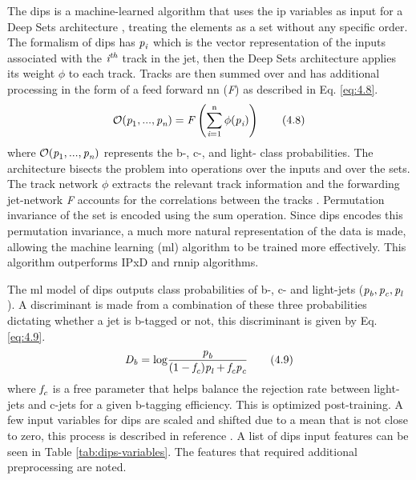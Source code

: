 The \gls{dips} is a machine-learned algorithm that uses the \gls{ip} variables as input for a Deep Sets architecture \cite{Deep_sets}, treating the elements as a set without any specific order. 
The formalism of \gls{dips} has $\textit{\textrm{p}}_{\textit{\textrm{i}}}$ which is the vector representation of the inputs associated with the $\textit{\textrm{i}}^{\textit{\textrm{th}}}$ 
track in the jet, then the Deep Sets architecture applies its weight $\phi$ to each track. Tracks are then summed over and has additional processing in the form of a feed forward 
\gls{nn} (\textit{F}) as described in Eq. \ref{eq:4.8}.
%
\begin{equation}\label{eq:4.8}
    \mathcal{O}({\textit{\textrm{p}}_{\textrm{1}},...,\textit{\textrm{p}}_{\textit{\textrm{n}}}}) = \textrm{\textit{F}}\left(\sum^{\textrm{n}}_{\textit{\textrm{i}}=\textrm{1}}\phi (\textrm{\textit{p}}_{\textit{\textrm{i}}})\right)
\tag{4.8}
\end{equation}
%
where $\mathcal{O}({\textit{\textrm{p}}_{\textrm{1}},...,\textit{\textrm{p}}_{\textit{\textrm{n}}}})$ represents the b-, c-, and light- class probabilities. The architecture 
bisects the problem into operations over the inputs and over the sets. The track network $\phi$ extracts the relevant track information and the forwarding jet-network \textit{F} 
accounts for the correlations between the tracks \cite{DIPS}. Permutation invariance of the set is encoded using the sum operation. Since \gls{dips} encodes this permutation 
invariance, a much more natural representation of the data is made, allowing the machine learning (\gls{ml}) algorithm to be trained more effectively. This algorithm outperforms 
IPxD and \gls{rnnip} algorithms. 
\par
The \gls{ml} model of \gls{dips} outputs class probabilities of b-, c- and light-jets ($\textit{\textrm{p}}_{\textit{\textrm{b}}}, \textit{\textrm{p}}_{\textit{\textrm{c}}}, \textit{\textrm{p}}_{\textit{\textrm{l}}}$).
A discriminant is made from a combination of these three probabilities dictating whether a jet is b-tagged or not, this discriminant is given by Eq. \ref{eq:4.9}.
%
\begin{equation}\label{eq:4.9}
    \textit{\textrm{D}}_{\textit{\textrm{b}}} = \textrm{log} \frac{\textit{\textrm{p}}_{\textit{\textrm{b}}}}{(\textrm{1}-\textit{\textrm{f}}_{\textit{\textrm{c}}})\textit{\textrm{p}}_{\textit{\textrm{l}}}+\textit{\textrm{f}}_{\textit{\textrm{c}}}\textit{\textrm{p}}_{\textit{\textrm{c}}}}
\tag{4.9}
\end{equation}
%
where $\textit{\textrm{f}}_{\textit{\textrm{c}}}$ is a free parameter that helps balance the rejection rate between light-jets and c-jets for a given b-tagging efficiency. This 
is optimized post-training. A few input variables for \gls{dips} are scaled and shifted due to a mean that is not close to zero, this process is described in reference \cite{DIPS}. 
A list of \gls{dips} input features can be seen in Table \ref{tab:dips-variables}. The features that required additional preprocessing are noted.

